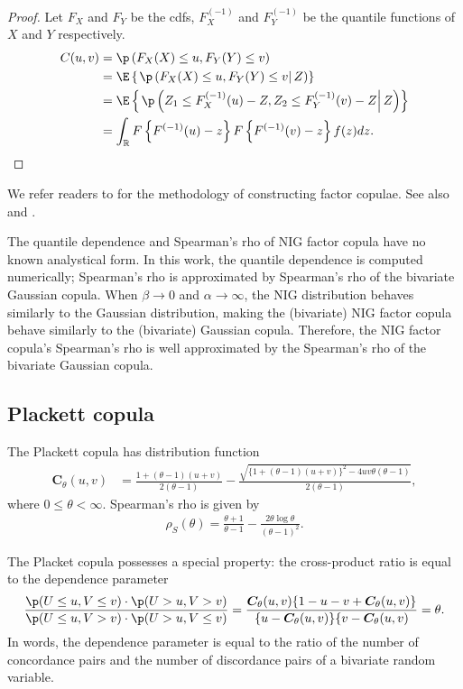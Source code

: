 \documentclass[11pt,a4paper,english]{article}
\begin{document}
\begin{proof}
  Let $F_X$ and $F_Y$ be the cdfs, $F_X^{(-1)}$ and $F_Y^{(-1)}$ be the quantile functions of $X$ and $Y$ respectively. 
  \begin{align*}
    C(u,v) &= \p\left(F_X(X) \leq u, F_Y(Y)\leq v\right)\\
           &= \E \left\{\left.\p\left(F_X(X) \leq u, F_Y(Y)\leq v \right|Z\right)\right\}\\
           &= \E \left\{\left.\p\left(Z_1 \leq F_X^{(-1)}(u)-Z, Z_2 \leq F_Y^{(-1)}(v)-Z \right|Z\right)\right\}\\
           &=  \int_\mathbb{R} F\left\{F^{(-1)}(u)-z\right\}F\left\{F^{(-1)}(v)-z\right\}f(z)dz.
  \end{align*} 
\end{proof}

We refer readers to \citet{krupskii2018factor} for the methodology of constructing factor copulae. 
See also \citet[Section 3.10]{joe2014dependence} and \citet{krupskii2013factor}. 

The quantile dependence and Spearman's rho of NIG factor copula have no known analystical form.
In this work, the quantile dependence is computed numerically; 
Spearman's rho is approximated by Spearman's rho of the bivariate Gaussian copula. 
When $\beta \rightarrow 0$ and $\alpha \rightarrow \infty$, the NIG
distribution behaves similarly to the Gaussian distribution, 
making the (bivariate) NIG factor copula behave similarly to the
(bivariate) Gaussian copula. 
Therefore, the NIG factor copula's Spearman's rho is well approximated by the Spearman's rho of the bivariate Gaussian copula.

\subsection{Plackett copula}\label{subsec:other-copula}
The Plackett copula has distribution function
\begin{align*}
    \bm{C}_{\theta}(u,v) &= \frac{1+(\theta-1)(u+v)}{2(\theta-1)}
                         - \frac{\sqrt{\{
    1+(\theta-1)(u+v)\}^2 - 4uv\theta(\theta-1)}}{2(\theta-1)},
\end{align*} where $0 \leq \theta < \infty$.
Spearman's rho is given by 
\begin{align*}
    \rho_S(\theta) = \frac{\theta+1}{\theta-1} - \frac{2\theta \log
  \theta}{(\theta-1)^2}. 
    \end{align*}

The Placket copula possesses a special property:
the cross-product ratio is equal to the dependence parameter
\begin{equation} \label{eq:PlackettCrossProduct}
    \frac{\p(U \leq u, V \leq v) \cdot \p(U > u, V > v)}
    {\p(U \leq u, V > v) \cdot \p(U > u, V \leq v)}\nonumber
    =
      \frac{\bm{C}_\theta(u,v)\{1-u-v+\bm{C}_\theta(u,v)\}}{\{u-\bm{C}_\theta(u,v)\}\{v-\bm{C}_\theta(u,v)}\nonumber 
    = \theta.
\end{equation}
In words, the dependence parameter is equal to the ratio of the 
number of concordance pairs and the number of discordance pairs of a 
bivariate random variable. 
\end{document}
